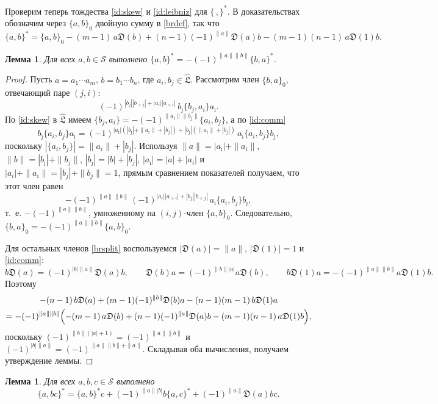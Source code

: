 \documentclass[11pt,reqno]{amsart}
\newcommand{\LL}{\mathfrak L}
\newcommand{\D}{\mathfrak D}
\newcommand{\Sm}{\mathcal S}
\newcommand{\Lh}{\widehat{\LL}}
\newcommand{\rp}[1]{\|#1\|}
\theoremstyle{plain}
\newtheorem{lemma}[theorem]{Лемма}
\theoremstyle{definition}
\theoremstyle{remark}
\begin{document}
Проверим теперь тождества \eqref{id:skew} и \eqref{id:leibniz} для $\{\,,\}^*$.
В доказательствах обозначим через $\{a,b\}_0$ двойную сумму в \eqref{brdef}, так что
\begin{equation}\label{brsplit}
\{a,b\}^*=\{a,b\}_0-(m-1)\,a\D(b)+(n-1)(-1)^{\rp a}\D(a)b-(m-1)(n-1)\,a\D(1)b .
\end{equation}

\begin{lemma}\label{lem:skew}
Для всех $a,b\in\Sm$ выполнено $\{a,b\}^*=-(-1)^{\rp a\rp b}\{b,a\}^*$.
\end{lemma}

\begin{proof}
Пусть $a=a_1\cdots a_m$, $b=b_1\cdots b_n$, где $a_i,b_j\in\Lh$.
Рассмотрим член $\{b,a\}_0$, отвечающий паре $(j,i)$:
$$
(-1)^{|b_j||b_{>j}|+|a_i||a_{<i}|}\,b_{\hat\jmath}\{b_j,a_i\}a_{\hat\imath}.
$$
По \eqref{id:skew} в $\Lh$ имеем $\{b_j,a_i\}=-(-1)^{\rp{a_i}\rp{b_j}}\{a_i,b_j\}$, а по \eqref{id:comm}
$$
b_{\hat\jmath}\{a_i,b_j\}a_{\hat\imath}=(-1)^{|a_{\hat\imath}|(|b_{\hat\jmath}|+\rp{a_i}+|b_j|)+|b_{\hat\jmath}|(\rp{a_i}+|b_j|)}\,a_{\hat\imath}\{a_i,b_j\}b_{\hat\jmath},
$$
поскольку $|\{a_i,b_j\}|=\rp{a_i}+|b_j|$.
Используя $\rp a=|a_{\hat\imath}|+\rp{a_i}$, $\rp b=|b_{\hat\jmath}|+\rp{b_j}$, $|b_{\hat\jmath}|=|b|+|b_j|$, $|a_{\hat\imath}|=|a|+|a_i|$ и $|a_i|+\rp{a_i}=|b_j|+\rp{b_j}=1$, прямым сравнением показателей получаем, что этот член равен
$$
-(-1)^{\rp a\rp b}\,(-1)^{|a_i||a_{>i}|+|b_j||b_{<j}|}\,a_{\hat\imath}\{a_i,b_j\}b_{\hat\jmath},
$$
т.~е. $-(-1)^{\rp a\rp b}$, умноженному на $(i,j)$-член $\{a,b\}_0$.
Следовательно, $\{b,a\}_0=-(-1)^{\rp a\rp b}\{a,b\}_0$.

Для остальных членов \eqref{brsplit} воспользуемся $|\D(a)|=\rp a$, $|\D(1)|=1$ и \eqref{id:comm}:
$$
b\D(a)=(-1)^{|b|\rp a}\D(a)b,\qquad \D(b)a=(-1)^{\rp b|a|}a\D(b),\qquad b\D(1)a=-(-1)^{\rp a\rp b}a\D(1)b .
$$
Поэтому
\begin{multline*}
-(n-1)\,b\D(a)+(m-1)(-1)^{\rp b}\D(b)a-(n-1)(m-1)\,b\D(1)a\\
=-(-1)^{\rp a\rp b}\Bigl(-(m-1)\,a\D(b)+(n-1)(-1)^{\rp a}\D(a)b-(m-1)(n-1)\,a\D(1)b\Bigr),
\end{multline*}
поскольку $(-1)^{\rp b(|a|+1)}=(-1)^{\rp a\rp b}$ и $(-1)^{|b|\rp a}=(-1)^{\rp a\rp b+\rp a}$.
Складывая оба вычисления, получаем утверждение леммы.
\end{proof}

\begin{lemma}\label{lem:leibniz}
Для всех $a,b,c\in\Sm$ выполнено
$$
\{a,bc\}^*=\{a,b\}^*c+(-1)^{\rp a|b|}b\{a,c\}^*+(-1)^{\rp a}\D(a)bc .
$$
\end{lemma}
\end{document}
